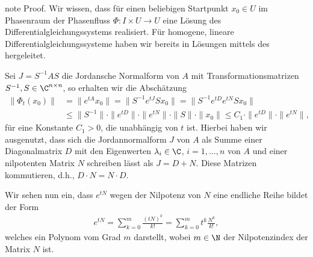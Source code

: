 \documentclass[letterpaper,10pt,english]{jupyterBook}
\begin{document}
\begin{sphinxadmonition}{note}
\sphinxAtStartPar
Proof. Wir wissen, dass für einen beliebigen Startpunkt \(x_0 \in U\) im Phasenraum der Phasenfluss \(\Phi \colon I \times U \rightarrow U\) eine Lösung des Differentialgleichungssystems realisiert.
Für homogene, lineare Differentialgleichungssysteme haben wir bereits in {\hyperref[\detokenize{ode/repetition:s-lineare-dglsysteme}]{}} Lösungen mittels des  hergeleitet.

\sphinxAtStartPar
Sei \(J = S^{-1}AS\) die Jordansche Normalform von \(A\) mit Transformationsmatrizen \(S^{-1},S \in \C^{n \times n}\), so erhalten wir die Abschätzung
\begin{equation*}
\begin{split}\|\Phi_t(x_0)\| &= \|e^{tA}x_0\| = \|S^{-1}e^{tJ}Sx_0\| = \|S^{-1}e^{tD}e^{tN}Sx_0\| \\
&\leq \|S^{-1}\| \cdot \|e^{tD}\| \cdot \|e^{tN}\| \cdot \|S\| \cdot \|x_0\| \leq C_1 \cdot \|e^{tD}\| \cdot \|e^{t N}\|,\end{split}
\end{equation*}
\sphinxAtStartPar
für eine Konstante \(C_1 > 0\), die unabhängig von \(t\) ist.
Hierbei haben wir ausgenutzt, dass sich die Jordannormalform \(J\) von \(A\) als Summe einer Diagonalmatrix \(D\) mit den Eigenwerten \(\lambda_i \in \C\), \(i=1,\ldots,n\) von \(A\) und einer nilpotenten Matrix \(N\) schreiben lässt als \(J = D + N\).
Diese Matrizen kommutieren, d.h., \(D \cdot N = N \cdot D\).

\sphinxAtStartPar
Wir sehen nun ein, dass \(e^{tN}\) wegen der Nilpotenz von \(N\) eine endliche Reihe bildet der Form
\begin{equation*}
\begin{split}e^{tN} = \sum_{k=0}^m \frac{(tN)^k}{k!} = \sum_{k=0}^m t^k\frac{N^k}{k!},\end{split}
\end{equation*}
\sphinxAtStartPar
welches ein Polynom vom Grad \(m\) darstellt, wobei \(m \in \N\) der Nilpotenzindex der Matrix \(N\) ist.


\end{sphinxadmonition}
\end{document}
